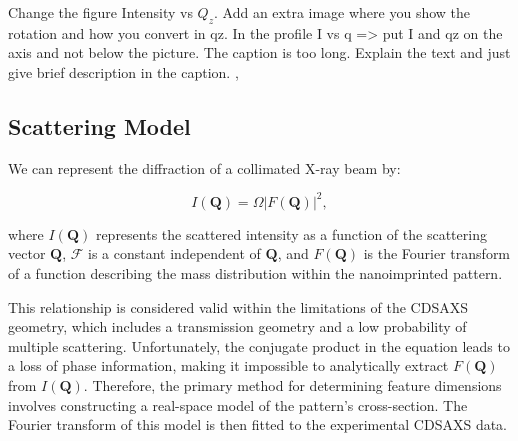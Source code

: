 \color{red} Change the figure Intensity vs $Q_z$. Add an extra image where you show the rotation and how you convert in qz.
In the profile I vs q => put I and qz on the axis and not below the picture. The caption is too long. Explain the text and just give brief description in the caption. \color{black},

\FloatBarrier

\subsection{Scattering Model} \label{sec:scattering_model}

\medskip
We can represent the diffraction of a collimated X-ray beam by:

\begin{equation}
    I(\mathbf{Q}) = \varOmega | F(\mathbf{Q}) |^2,
\end{equation}
    
where $I(\mathbf{Q})$ represents the scattered intensity as a function of the scattering
vector $\mathbf{Q}$, $\mathcal{F}$ is a constant independent of $\mathbf{Q}$,
and $F(\mathbf{Q})$ is the Fourier transform of a function describing the mass
distribution within the nanoimprinted pattern. 
    
This relationship is considered valid within the limitations of the CDSAXS geometry,
which includes a transmission geometry and a low probability of multiple scattering.    
Unfortunately, the conjugate product in the equation leads to a loss of phase
information, making it impossible to analytically extract $F(\mathbf{Q})$ from $I(\mathbf{Q})$.
Therefore, the primary method for determining feature dimensions involves constructing
a real-space model of the pattern's cross-section. The Fourier transform of this 
model is then fitted to the experimental CDSAXS data.

\medskip

